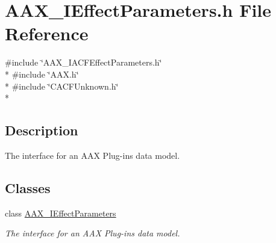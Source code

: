 \hypertarget{a00247}{}\section{A\+A\+X\+\_\+\+I\+Effect\+Parameters.\+h File Reference}
\label{a00247}
{\ttfamily \#include \char`\"{}A\+A\+X\+\_\+\+I\+A\+C\+F\+Effect\+Parameters.\+h\char`\"{}}\\*
{\ttfamily \#include \char`\"{}A\+A\+X.\+h\char`\"{}}\\*
{\ttfamily \#include \char`\"{}C\+A\+C\+F\+Unknown.\+h\char`\"{}}\\*


\subsection{Description}
The interface for an A\+A\+X Plug-\/in\textquotesingle{}s data model. 

\subsection*{Classes}
\begin{DoxyCompactItemize}
\item 
class \hyperlink{a00099}{A\+A\+X\+\_\+\+I\+Effect\+Parameters}
\begin{DoxyCompactList}\small\item\em The interface for an A\+A\+X Plug-\/in\textquotesingle{}s data model. \end{DoxyCompactList}\end{DoxyCompactItemize}
